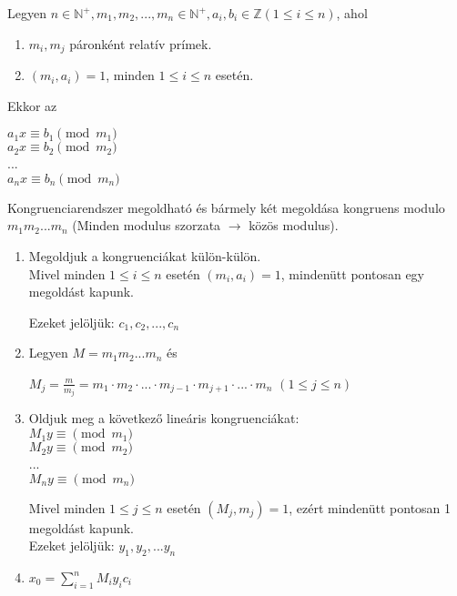 \begin{frame}
  \begin{tcolorbox}[title={Tétel: Kínai maradéktétel}]
    Legyen $n \in \mathbb{N}^+, m_1, m_2, ..., m_n \in \mathbb{N}^+, a_i, b_i \in \mathbb{Z} (1 \leq i \leq n)$, ahol
    \begin{enumerate}
      \item $m_i, m_j$ páronként relatív prímek.
      \item $(m_i, a_i) = 1$, minden $1 \leq i \leq n$ esetén.
    \end{enumerate}
    Ekkor az\\
    \mmedskip
    
    	$a_1x \equiv b_1 \pmod{m_1}$\\
    	$a_2x \equiv b_2 \pmod{m_2}$\\
    	...\\
    	$a_nx \equiv b_n \pmod{m_n}$\\
    \mmedskip
    
    Kongruenciarendszer megoldható és bármely két megoldása kongruens modulo $m_1m_2...m_n$ (Minden modulus szorzata $\rightarrow$ közös modulus).
  \end{tcolorbox}

  \begin{tcolorbox}[title={A kínai maradéktétel megoldása}]
    \begin{enumerate}
      \item Megoldjuk a kongruenciákat külön-külön.\\
      Mivel minden  $1 \leq i \leq n$ esetén $(m_i, a_i) = 1$, mindenütt pontosan egy megoldást kapunk.\\
      \msmallskip
      
      Ezeket jelöljük: $c_1, c_2, ..., c_n$
      \item Legyen $M = m_1m_2...m_n$ és\\
       \msmallskip
       
      $M_j = \frac{m}{m_j} = m_1 \cdot m_2 \cdot ... \cdot m_{j - 1} \cdot m_{j + 1} \cdot ... \cdot m_n$ $(1 \leq j \leq n)$
      \item Oldjuk meg a következő lineáris kongruenciákat:\\
      $M_1y \equiv \pmod{m_1}$\\
      $M_2y \equiv \pmod{m_2}$\\
      ...\\
      $M_ny \equiv \pmod{m_n}$\\
      \msmallskip
      
      Mivel minden $1 \leq j \leq n$ esetén $(M_j, m_j) = 1$, ezért mindenütt pontosan 1 megoldást kapunk.\\
      Ezeket jelöljük: $y_1, y_2, ... y_n$
      \item $x_0 = \sum_{i = 1}^n M_iy_ic_i$
    \end{enumerate}
  \end{tcolorbox}
\end{frame}

